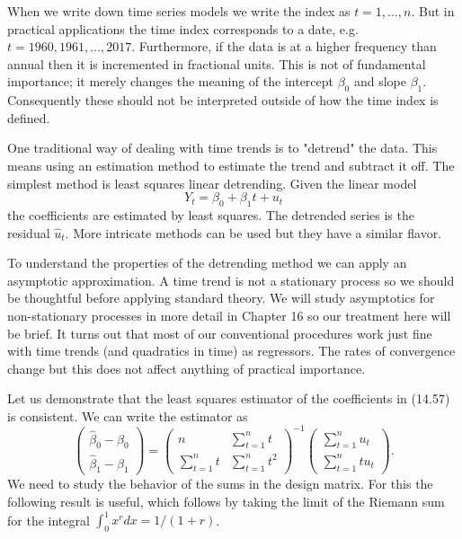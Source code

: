 \documentclass[10pt]{article}
\begin{document}
When we write down time series models we write the index as $t=1, \ldots, n$. But in practical applications the time index corresponds to a date, e.g. $t=1960,1961, \ldots, 2017$. Furthermore, if the data is at a higher frequency than annual then it is incremented in fractional units. This is not of fundamental importance; it merely changes the meaning of the intercept $\beta_{0}$ and slope $\beta_{1}$. Consequently these should not be interpreted outside of how the time index is defined.

One traditional way of dealing with time trends is to "detrend" the data. This means using an estimation method to estimate the trend and subtract it off. The simplest method is least squares linear detrending. Given the linear model
$$
Y_{t}=\beta_{0}+\beta_{1} t+u_{t}
$$
the coefficients are estimated by least squares. The detrended series is the residual $\widehat{u}_{t}$. More intricate methods can be used but they have a similar flavor.

To understand the properties of the detrending method we can apply an asymptotic approximation. A time trend is not a stationary process so we should be thoughtful before applying standard theory. We will study asymptotics for non-stationary processes in more detail in Chapter 16 so our treatment here will be brief. It turns out that most of our conventional procedures work just fine with time trends (and quadratics in time) as regressors. The rates of convergence change but this does not affect anything of practical importance.

Let us demonstrate that the least squares estimator of the coefficients in (14.57) is consistent. We can write the estimator as
$$
\left(\begin{array}{c}
\widehat{\beta}_{0}-\beta_{0} \\
\widehat{\beta}_{1}-\beta_{1}
\end{array}\right)=\left(\begin{array}{cc}
n & \sum_{t=1}^{n} t \\
\sum_{t=1}^{n} t & \sum_{t=1}^{n} t^{2}
\end{array}\right)^{-1}\left(\begin{array}{c}
\sum_{t=1}^{n} u_{t} \\
\sum_{t=1}^{n} t u_{t}
\end{array}\right) .
$$
We need to study the behavior of the sums in the design matrix. For this the following result is useful, which follows by taking the limit of the Riemann sum for the integral $\int_{0}^{1} x^{r} d x=1 /(1+r)$.
\end{document}
